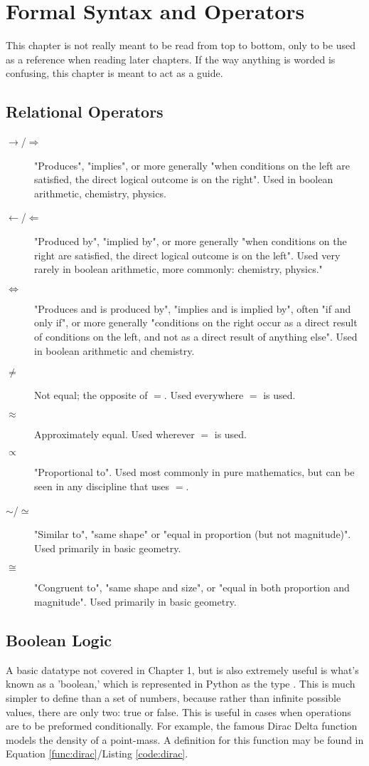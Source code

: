 \chapter{Formal Syntax and Operators}
This chapter is not really meant to be read from top to bottom, only to be used as a reference when reading later chapters. If the way anything is worded is confusing, this chapter is meant to act as a guide.

\section{Relational Operators}\label{sec:relational-operators}
\begin{description}
	\item[$\rightarrow$/$\Longrightarrow$]
		"Produces", "implies", or more generally "when conditions on the left are satisfied, the direct logical outcome is on the right". Used in boolean arithmetic, chemistry, physics.
	\item[$\leftarrow$/$\Longleftarrow$]
		"Produced by", "implied by", or more generally "when conditions on the right are satisfied, the direct logical outcome is on the left". Used very rarely in boolean arithmetic, more commonly: chemistry, physics."
	\item[$\iff$]
		"Produces and is produced by", "implies and is implied by", often "if and only if", or more generally "conditions on the right occur as a direct result of conditions on the left, and not as a direct result of anything else". Used in boolean arithmetic and chemistry.
	\item[$\ne$]
		Not equal; the opposite of $=$. Used everywhere $=$ is used.
	\item[$\approx$]
		Approximately equal. Used wherever $=$ is used.
	\item[$\propto$]
		"Proportional to". Used most commonly in pure mathematics, but can be seen in any discipline that uses $=$.
	\item[$\sim$/$\simeq$]
		"Similar to", "same shape" or "equal in proportion (but not magnitude)". Used primarily in basic geometry.
	\item[$\cong$]
		"Congruent to", "same shape and size", or "equal in both proportion and magnitude". Used primarily in basic geometry.
\end{description}

\section{Boolean Logic}
A basic datatype not covered in Chapter 1, but is also extremely useful is what's known as a 'boolean,' which is represented in Python as the type . This is much simpler to define than a set of numbers, because rather than infinite possible values, there are only two: true or false. This is useful in cases when operations are to be preformed conditionally. For example, the famous Dirac Delta function models the density of a point-mass. A definition for this function may be found in Equation \ref{func:dirac}/Listing \ref{code:dirac}.

